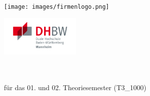 


\begin{titlepage}

	\begin{center}
		\begin{minipage}[]{0.49\textwidth}
			\begin{flushleft}
				\texttt{[image: images/firmenlogo.png]}
			\end{flushleft}
		\end{minipage}
		\begin{minipage}[]{0.49\textwidth}
			\begin{flushright}
				\includegraphics[width=3.9cm]{images/dhbw.jpg}
			\end{flushright}
		\end{minipage}
	\end{center}

	\enlargethispage{20mm}

	\begin{center}
		\vspace*{6mm}	{\thesistype}\\
		\doublespacing
		\vspace*{12mm}	{\LARGE\textbf{{\thesistitle}}}\\
		\onehalfspacing
		\vspace*{12mm}	für das 01. und 02. Theoriesemester (T3\_1000)\\
		\vspace*{3mm}		\langarticlecourseofstudies{} \langcourseofstudies{} \textbf{\coursesofstudies}\\
		\vspace*{3mm}		\langatthedh{} \dhbwcity\\
		\vspace*{7mm}	\langby\\
		\vspace*{3mm}		{\large\textbf \thesisauthor}\\
		\vspace*{7mm}	\submissiondate\\
	\end{center}


\end{titlepage}

